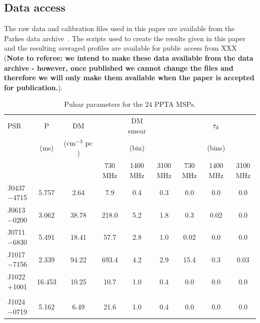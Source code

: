 \documentclass[useAMS,usenatbib]{mn2e}
\begin{document}
\subsection{Data access}

The raw data and calibration files used in this paper are available from the 
Parkes data archive~\citep[][data.csiro.au]{Hobbs11}.  
%
The scripts used to create the results given in this paper and the resulting averaged 
profiles are available for public access from XXX ({\bf Note to referee: we intend 
to make these data available from the data archive - however, once published we cannot 
change the files and therefore we will only make them available when the paper is accepted 
for publication.}). 

\begin{table}
\caption{Pulsar parameters for the $24$ PPTA MSPs.}
\label{psr}
\begin{center}
\begin{tabular}{lcccccccc}
\hline
PSR         &   P     &       DM          &          &  DM smear &             &          &   $\tau_{\rm{d}}$ &           \\
            &  (ms)   &  ($\rm{cm^{-3}\ pc}$)  &          &   (bin)   &             &          &     (bins)        &           \\
			      &         &                   &  730 MHz & 1400 MHz  & 3100 MHz    & 730 MHz  &     1400 MHz      & 3100 MHz  \\
\hline
J0437$-$4715&  5.757  &  2.64             & 7.9      & 0.4       & 0.3         &  0.0     &  0.0              &  0.0     \\
J0613$-$0200&  3.062  &  38.78            & 218.0    & 5.2       & 1.8         &  0.3     &  0.02             &  0.0      \\
J0711$-$6830&  5.491  &  18.41            & 57.7     & 2.8       & 1.0         &  0.02    &  0.0              &  0.0     \\
J1017$-$7156&  2.339  &  94.22            & 693.4    & 4.2       & 2.9         &  15.4    &  0.3              &  0.03    \\
J1022$+$1001&  16.453 &  10.25            & 10.7     & 1.0       & 0.4         &  0.0     &  0.0              &  0.0      \\
            &         &                   &          &           &             &          &                   &           \\
J1024$-$0719&  5.162  &  6.49             & 21.6     & 1.0       & 0.4         &  0.0     &  0.0              &  0.0      \\

\end{tabular}
\end{center}
\end{table}
\end{document}
